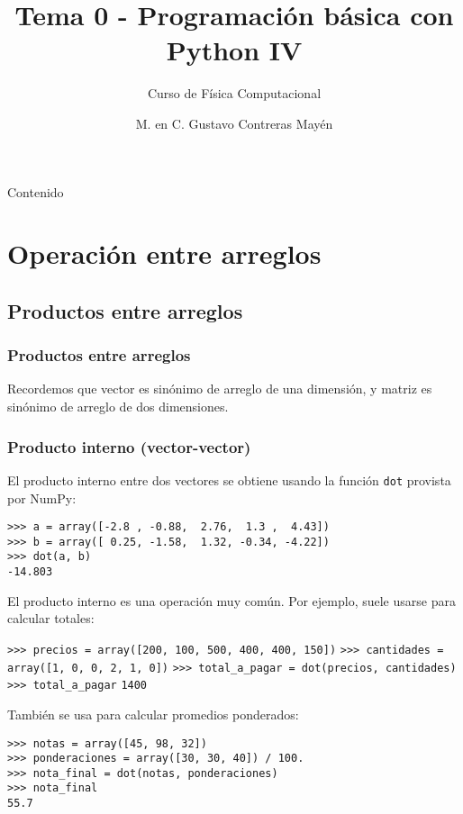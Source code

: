 

\title{Tema 0 - Programación básica con Python IV}
\subtitle{Curso de Física Computacional}
\author[]{M. en C. Gustavo Contreras Mayén}
\date{}

\maketitle
\fontsize{12}{12}\selectfont
{}
\begin{frame}{Contenido}
\tableofcontents[pausesections]
\end{frame}
\section{Operación entre arreglos}
\subsection{Productos entre arreglos}
\begin{frame}
\frametitle{Productos entre arreglos}
Recordemos que vector es sinónimo de arreglo de una dimensión, y matriz es sinónimo de arreglo de dos dimensiones.
\end{frame}
\begin{frame}[fragile]
\frametitle{Producto interno (vector-vector)}
El producto interno entre dos vectores se obtiene usando la función \texttt{dot} provista por NumPy:
\fontsize{12}{12}\selectfont
\begin{exampleblock}{}
\verb|>>> a = array([-2.8 , -0.88,  2.76,  1.3 ,  4.43])| \\
\verb|>>> b = array([ 0.25, -1.58,  1.32, -0.34, -4.22])| \\
\pause
\verb|>>> dot(a, b)| \\
\pause
\verb|-14.803|
\end{exampleblock}
\end{frame}
\begin{frame}[fragile]
El producto interno es una operación muy común. Por ejemplo, suele usarse para calcular totales:
\fontsize{12}{12}\selectfont
\begin{exampleblock}{}
\verb|>>> precios = array([200, 100, 500, 400, 400, 150])|
\verb|>>> cantidades = array([1, 0, 0, 2, 1, 0])|
\pause
\verb|>>> total_a_pagar = dot(precios, cantidades)|
\pause
\verb|>>> total_a_pagar|
\pause
\verb|1400|
\end{exampleblock}
También se usa para calcular promedios ponderados:
\begin{exampleblock}{}
\verb|>>> notas = array([45, 98, 32])| \\
\pause
\verb|>>> ponderaciones = array([30, 30, 40]) / 100.| \\
\pause
\verb|>>> nota_final = dot(notas, ponderaciones)| \\
\pause
\verb|>>> nota_final| \\
\verb|55.7|
\end{exampleblock}
\end{frame}
